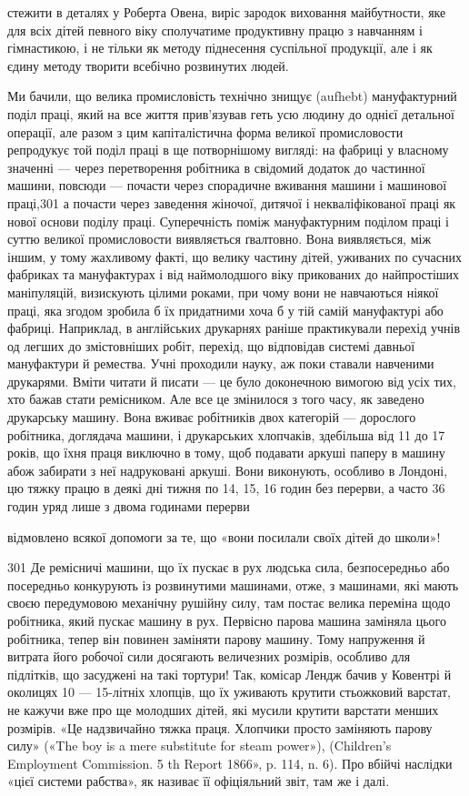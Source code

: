 стежити в деталях у Роберта Овена, виріс зародок виховання
майбутности, яке для всіх дітей певного віку сполучатиме продуктивну
працю з навчанням і гімнастикою, і не тільки як методу
піднесення суспільної продукції, але і як єдину методу творити
всебічно розвинутих людей.

Ми бачили, що велика промисловість технічно знищує (aufhebt)
мануфактурний поділ праці, який на все життя прив’язував
геть усю людину до однієї детальної операції, але разом з цим
капіталістична форма великої промисловости репродукує той
поділ праці в ще потворнішому вигляді: на фабриці у власному
значенні — через перетворення робітника в свідомий додаток
до частинної машини, повсюди — почасти через спорадичне вживання
машини і машинової праці,301 а почасти через заведення
жіночої, дитячої і некваліфікованої праці як нової основи поділу
праці. Суперечність поміж мануфактурним поділом праці і суттю
великої промисловости виявляється ґвалтовно. Вона виявляється,
між іншим, у тому жахливому факті, що велику частину дітей,
уживаних по сучасних фабриках та мануфактурах і від наймолодшого
віку прикованих до найпростіших маніпуляцій, визискують
цілими роками, при чому вони не навчаються ніякої праці, яка
згодом зробила б їх придатними хоча б у тій самій мануфактурі
або фабриці. Наприклад, в англійських друкарнях раніше практикували
перехід учнів од легших до змістовніших робіт, перехід,
що відповідав системі давньої мануфактури й ремества. Учні
проходили науку, аж поки ставали навченими друкарями. Вміти
читати й писати — це було доконечною вимогою від усіх тих,
хто бажав стати ремісником. Але все це змінилося з того часу,
як заведено друкарську машину. Вона вживає робітників двох
категорій — дорослого робітника, доглядача машини, і друкарських
хлопчаків, здебільша від 11 до 17 років, що їхня праця
виключно в тому, щоб подавати аркуші паперу в машину абож
забирати з неї надруковані аркуші. Вони виконують, особливо
в Лондоні, цю тяжку працю в деякі дні тижня по 14, 15, 16 годин
без перерви, а часто 36 годин уряд лише з двома годинами перерви

відмовлено всякої допомоги за те, що «вони посилали своїх дітей до
школи»!

301    Де ремісничі машини, що їх пускає в рух людська сила, безпосередньо
або посередньо конкурують із розвинутими машинами, отже, з
машинами, які мають своєю передумовою механічну рушійну силу, там
постає велика переміна щодо робітника, який пускає машину в рух.
Первісно парова машина заміняла цього робітника, тепер він повинен
заміняти парову машину. Тому напруження й витрата його робочої сили
досягають величезних розмірів, особливо для підлітків, що засуджені
на такі тортури! Так, комісар Лендж бачив у Ковентрі й околицях 10 —
15-літніх хлопців, що їх уживають крутити стьожковий варстат, не
кажучи вже про ще молодших дітей, які мусили крутити варстати менших
розмірів. «Це надзвичайно тяжка праця. Хлопчики просто заміняють
парову силу» («The boy is a mere substitute for steam power»),
(Children’s Employment Commission. 5 th Report 1866», p. 114, n. 6). Про
вбійчі наслідки «цієї системи рабства», як називає її офіціяльний звіт,
там же і далі.
